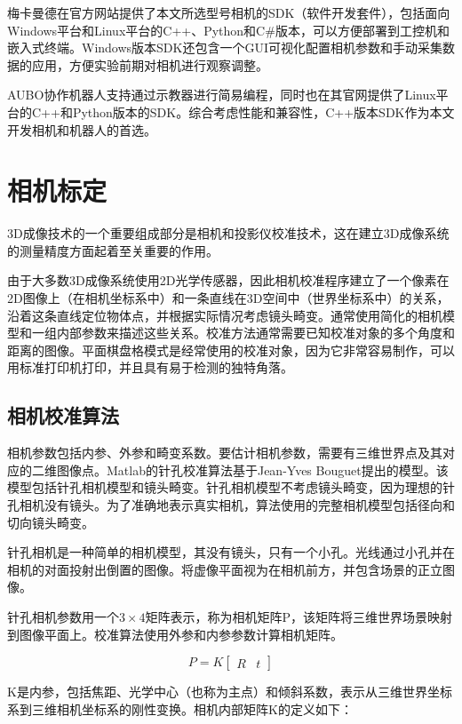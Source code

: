 梅卡曼德在官方网站提供了本文所选型号相机的SDK（软件开发套件），包括面向Windows平台和Linux平台的C++、Python和C\#版本，可以方便部署到工控机和嵌入式终端。Windows版本SDK还包含一个GUI可视化配置相机参数和手动采集数据的应用，方便实验前期对相机进行观察调整。

AUBO协作机器人支持通过示教器进行简易编程，同时也在其官网提供了Linux平台的C++和Python版本的SDK。综合考虑性能和兼容性，C++版本SDK作为本文开发相机和机器人的首选。

\section{相机标定}
3D成像技术的一个重要组成部分是相机和投影仪校准技术，这在建立3D成像系统的测量精度方面起着至关重要的作用。

由于大多数3D成像系统使用2D光学传感器，因此相机校准程序建立了一个像素在2D图像上（在相机坐标系中）和一条直线在3D空间中（世界坐标系中）的关系，沿着这条直线定位物体点，并根据实际情况考虑镜头畸变。通常使用简化的相机模型和一组内部参数来描述这些关系。校准方法通常需要已知校准对象的多个角度和距离的图像。平面棋盘格模式是经常使用的校准对象，因为它非常容易制作，可以用标准打印机打印，并且具有易于检测的独特角落。

\subsection{相机校准算法}

相机参数包括内参、外参和畸变系数。要估计相机参数，需要有三维世界点及其对应的二维图像点。Matlab的针孔校准算法基于Jean-Yves Bouguet提出的模型。该模型包括针孔相机模型\cite{zhangFlexibleNewTechnique2000}和镜头畸变\cite{heikkilaFourstepCameraCalibration1997}。针孔相机模型不考虑镜头畸变，因为理想的针孔相机没有镜头。为了准确地表示真实相机，算法使用的完整相机模型包括径向和切向镜头畸变。

针孔相机是一种简单的相机模型，其没有镜头，只有一个小孔。光线通过小孔并在相机的对面投射出倒置的图像。将虚像平面视为在相机前方，并包含场景的正立图像。

针孔相机参数用一个$3\times4$矩阵表示，称为相机矩阵P，该矩阵将三维世界场景映射到图像平面上。校准算法使用外参和内参参数计算相机矩阵。

\begin{equation}
  P=K\begin{bmatrix}
    R & t
  \end{bmatrix}
\end{equation}


K是内参，包括焦距、光学中心（也称为主点）和倾斜系数，表示从三维世界坐标系到三维相机坐标系的刚性变换。相机内部矩阵K的定义如下：

